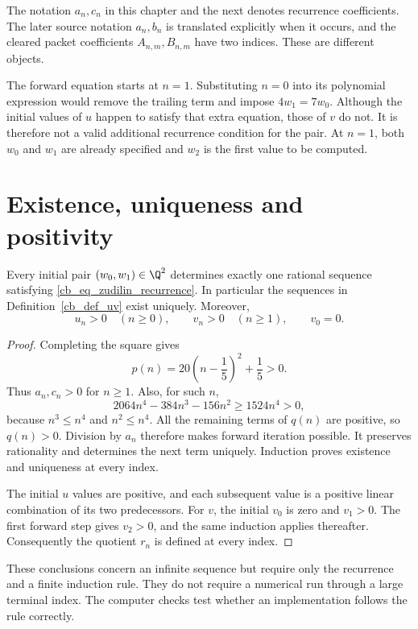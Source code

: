 The notation $a_n,c_n$ in this chapter and the next denotes recurrence
coefficients. The later source notation $a_n,b_n$ is translated explicitly
when it occurs, and the cleared packet coefficients $A_{n,m},B_{n,m}$ have
two indices. These are different objects.

The forward equation starts at $n=1$. Substituting $n=0$ into its polynomial
expression would remove the trailing term and impose $4w_1=7w_0$. Although
the initial values of $u$ happen to satisfy that extra equation, those of
$v$ do not. It is therefore not a valid additional recurrence condition
for the pair. At $n=1$, both $w_0$ and $w_1$ are already specified and
$w_2$ is the first value to be computed.

\section{Existence, uniqueness and positivity}

\begin{proposition}\label{cb_prop_forward}
Every initial pair $(w_0,w_1)\in\Q^2$ determines exactly one rational
sequence satisfying \eqref{cb_eq_zudilin_recurrence}. In particular the
sequences in Definition~\ref{cb_def_uv} exist uniquely. Moreover,
\[
 u_n>0\quad(n\geq0),\qquad v_n>0\quad(n\geq1),\qquad v_0=0.
\]
\end{proposition}

\begin{proof}
Completing the square gives
\[
 p(n)=20\left(n-\frac15\right)^2+\frac15>0.
\]
Thus $a_n,c_n>0$ for $n\geq1$. Also, for such $n$,
\[
 2064n^4-384n^3-156n^2\geq1524n^4>0,
\]
because $n^3\leq n^4$ and $n^2\leq n^4$. All the remaining terms of $q(n)$
are positive, so $q(n)>0$. Division by $a_n$ therefore makes forward
iteration possible. It preserves rationality and determines the next term
uniquely. Induction proves existence and uniqueness at every index.

The initial $u$ values are positive, and each subsequent value is a positive
linear combination of its two predecessors. For $v$, the initial $v_0$ is
zero and $v_1>0$. The first forward step gives $v_2>0$, and the same
induction applies thereafter. Consequently the quotient $r_n$ is defined
at every index.
\end{proof}

These conclusions concern an infinite sequence but require only the
recurrence and a finite induction rule. They do not require a numerical
run through a large terminal index. The computer checks test whether an
implementation follows the rule correctly.

